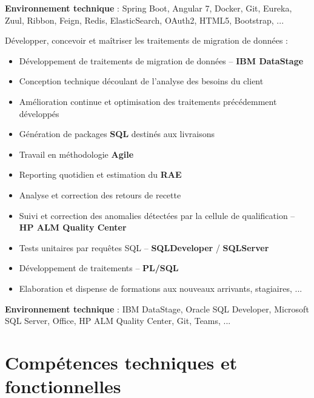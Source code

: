\documentclass[12pt,a4paper,sans]{moderncv} %
\begin{document}
\vspace{1ex}

\textbf{Environnement technique} : Spring Boot, Angular 7, Docker, Git, Eureka, Zuul, Ribbon, Feign, Redis, ElasticSearch, OAuth2, HTML5, Bootstrap, ...

\newpage


\vspace{1ex}

Développer, concevoir et maîtriser les traitements de migration de données :

{\begin{itemize}
\item Développement de traitements de migration de données -- \textbf{IBM DataStage}
\item Conception technique découlant de l’analyse des besoins du client
\item Amélioration continue et optimisation des traitements précédemment développés
\item Génération de packages \textbf{SQL} destinés aux livraisons
\item Travail en méthodologie \textbf{Agile}
\item Reporting quotidien et estimation du \textbf{RAE}
\item Analyse et correction des retours de recette
\item Suivi  et correction des anomalies détectées par la cellule de qualification -- \textbf{HP ALM Quality Center}
\item Tests unitaires par requêtes SQL -- \textbf{SQLDeveloper} / \textbf{SQLServer}
\item Développement de traitements -- \textbf{PL/SQL}
\item Elaboration et dispense de formations aux nouveaux arrivants, stagiaires, ...
\end{itemize}}

\vspace{1ex}

\textbf{Environnement technique} : IBM DataStage, Oracle SQL Developer, Microsoft SQL Server, Office, HP ALM Quality Center, Git, Teams, ...

\section{Compétences techniques et fonctionnelles}
\end{document}
